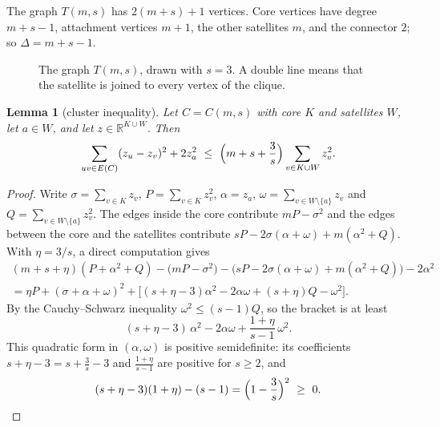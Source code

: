 \documentclass[11pt]{amsart}
\newtheorem{lemma}[theorem]{Lemma}
\theoremstyle{definition}
\theoremstyle{remark}
\newcommand{\R}{\mathbb{R}}
\begin{document}
The graph $T(m,s)$ has $2(m+s)+1$ vertices. Core vertices have degree $m+s-1$, attachment
vertices $m+1$, the other satellites $m$, and the connector $2$; so $\Delta=m+s-1$.

\begin{figure}[ht]
\centering
{}
\caption{The graph $T(m,s)$, drawn with $s=3$. A double line means that the satellite is joined
to every vertex of the clique.}\label{fig:T}
\end{figure}

\begin{lemma}[cluster inequality]\label{lem:cluster}
Let $C=C(m,s)$ with core $K$ and satellites $W$, let $a\in W$, and let $z\in\R^{K\cup W}$. Then
\[
\sum_{uv\in E(C)}(z_u-z_v)^2+2z_a^2\ \le\ \Bigl(m+s+\frac{3}{s}\Bigr)\sum_{v\in K\cup W}z_v^2 .
\]
\end{lemma}

\begin{proof}
Write $\sigma=\sum_{v\in K}z_v$, $P=\sum_{v\in K}z_v^2$, $\alpha=z_a$,
$\omega=\sum_{v\in W\setminus\{a\}}z_v$ and $Q=\sum_{v\in W\setminus\{a\}}z_v^2$. The edges inside
the core contribute $mP-\sigma^2$ and the edges between the core and the satellites contribute
$sP-2\sigma(\alpha+\omega)+m(\alpha^2+Q)$. With $\eta=3/s$, a direct computation gives
\begin{multline*}
(m+s+\eta)(P+\alpha^2+Q)-\bigl(mP-\sigma^2\bigr)-\bigl(sP-2\sigma(\alpha+\omega)+m(\alpha^2+Q)\bigr)-2\alpha^2\\
=\eta P+(\sigma+\alpha+\omega)^2+\bigl[(s+\eta-3)\alpha^2-2\alpha\omega+(s+\eta)Q-\omega^2\bigr].
\end{multline*}
By the Cauchy--Schwarz inequality $\omega^2\le(s-1)Q$, so the bracket is at least
\[
(s+\eta-3)\,\alpha^2-2\alpha\omega+\frac{1+\eta}{s-1}\,\omega^2 .
\]
This quadratic form in $(\alpha,\omega)$ is positive semidefinite: its coefficients
$s+\eta-3=s+\frac3s-3$ and $\frac{1+\eta}{s-1}$ are positive for $s\ge2$, and
\[
(s+\eta-3)(1+\eta)-(s-1)=\Bigl(1-\frac{3}{s}\Bigr)^2\ \ge\ 0 .\qedhere
\]
\end{proof}
\end{document}
